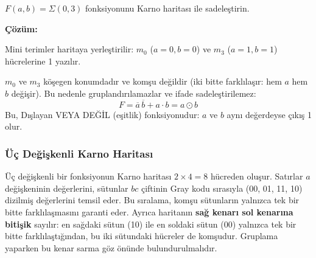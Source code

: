\begin{ornek}[B.4]
$F(a,b) = \Sigma(0, 3)$ fonksiyonunu Karno haritası ile sadeleştirin.

\textbf{Çözüm:}

Mini terimler haritaya yerleştirilir: $m_0$ ($a=0, b=0$) ve $m_3$ ($a=1, b=1$) hücrelerine 1 yazılır.

\begin{center}
\end{center}

$m_0$ ve $m_3$ köşegen konumdadır ve komşu değildir (iki bitte farklılaşır: hem $a$ hem $b$ değişir). Bu nedenle gruplandırılamazlar ve ifade sadeleştirilemez:
\[
F = \overline{a}\,\overline{b} + a \cdot b = a \odot b
\]
Bu, Dışlayan VEYA DEĞİL (eşitlik) fonksiyonudur: $a$ ve $b$ aynı değerdeyse çıkış 1 olur.
\end{ornek}

\subsubsection{Üç Değişkenli Karno Haritası}

Üç değişkenli bir fonksiyonun Karno haritası $2 \times 4 = 8$ hücreden oluşur. Satırlar $a$ değişkeninin değerlerini, sütunlar $bc$ çiftinin Gray kodu sırasıyla (00, 01, 11, 10) dizilmiş değerlerini temsil eder. Bu sıralama, komşu sütunların yalnızca tek bir bitte farklılaşmasını garanti eder. Ayrıca haritanın \textbf{sağ kenarı sol kenarına bitişik} sayılır: en sağdaki sütun (10) ile en soldaki sütun (00) yalnızca tek bir bitte farklılaştığından, bu iki sütundaki hücreler de komşudur. Gruplama yaparken bu kenar sarma göz önünde bulundurulmalıdır.


